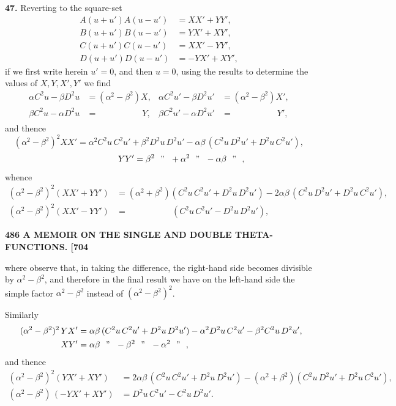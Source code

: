\documentclass[11pt]{article}
\begin{document}
\textbf{47.} Reverting to the square-set
\[
\begin{aligned}
A(u+u')A(u-u') &= XX' + YY',\\
B(u+u')B(u-u') &= YX' + XY',\\
C(u+u')C(u-u') &= XX' - YY',\\
D(u+u')D(u-u') &= -YX' + XY',
\end{aligned}
\]
if we first write herein $u'=0$, and then $u=0$, using the results to determine the values of $X,Y,X',Y'$ we find
\[
\begin{aligned}
\alpha C^2 u - \beta D^2 u &= (\alpha^2-\beta^2)X, & \alpha C^2 u' - \beta D^2 u' &= (\alpha^2-\beta^2)X',\\
\beta C^2 u - \alpha D^2 u &= \phantom{(\alpha^2-\beta^2)}\,Y, & \beta C^2 u' - \alpha D^2 u' &= \phantom{(\alpha^2-\beta^2)}\,Y',
\end{aligned}
\]
and thence
\[
(\alpha^2-\beta^2)^2 XX' = \alpha^2 C^2 u\,C^2 u' + \beta^2 D^2 u\,D^2 u' - \alpha\beta\,(C^2 u\,D^2 u' + D^2 u\,C^2 u'),
\]
\[
\phantom{(\alpha^2-\beta^2)^2}\ \ YY' = \beta^2\ \ \mathrm{"}\ \ + \alpha^2\ \ \mathrm{"}\ \ - \alpha\beta\ \ \mathrm{"}\ \ ,
\]
whence
\[
\begin{aligned}
(\alpha^2-\beta^2)^2 (XX'+YY') &= (\alpha^2+\beta^2)(C^2 u\,C^2 u' + D^2 u\,D^2 u') - 2\alpha\beta\,(C^2 u\,D^2 u' + D^2 u\,C^2 u'),\\
(\alpha^2-\beta^2)^2 (XX'-YY') &= \phantom{(\alpha^2-\beta^2)}\,(C^2 u\,C^2 u' - D^2 u\,D^2 u'),
\end{aligned}
\]

\bigskip
\noindent\textbf{486 \hfill A MEMOIR ON THE SINGLE AND DOUBLE THETA-FUNCTIONS. \hfill [704}

\medskip
where observe that, in taking the difference, the right-hand side becomes divisible by $\alpha^2-\beta^2$, and therefore in the final result we have on the left-hand side the simple factor $\alpha^2-\beta^2$ instead of $(\alpha^2-\beta^2)^2$.

Similarly
\[
\begin{aligned}
(\alpha^2-\beta^2)^2\,YX' &= \alpha\beta\,(C^2 u\,C^2 u' + D^2 u\,D^2 u') - \alpha^2 D^2 u\,C^2 u' - \beta^2 C^2 u\,D^2 u',\\
\phantom{(\alpha^2-\beta^2)^2}\ \ XY' &= \alpha\beta\ \ \mathrm{"}\ \ - \beta^2\ \ \mathrm{"}\ \ - \alpha^2\ \ \mathrm{"}\ \ ,
\end{aligned}
\]
and thence
\[
\begin{aligned}
(\alpha^2-\beta^2)^2 (YX'+XY') &= 2\alpha\beta\,(C^2 u\,C^2 u' + D^2 u\,D^2 u') - (\alpha^2+\beta^2)(C^2 u\,D^2 u' + D^2 u\,C^2 u'),\\
(\alpha^2-\beta^2)\,(-YX'+XY') &= D^2 u\,C^2 u' - C^2 u\,D^2 u'.
\end{aligned}
\]
\end{document}
